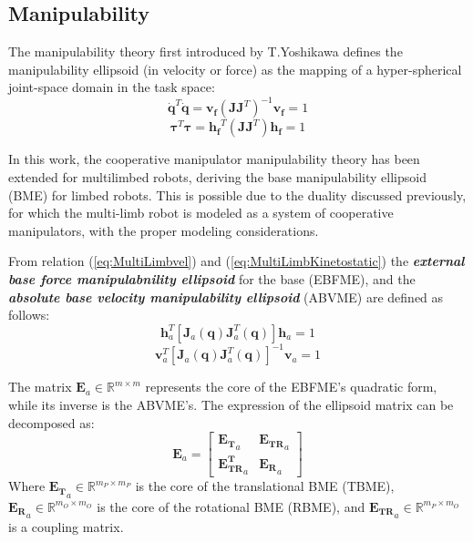 \documentclass[11pt,a4paper,twocolumn]{article}
\begin{document}
\subsection{Manipulability}
\label{subsec:manipulability}

The manipulability theory first introduced by T.Yoshikawa\cite{ManipulabilityYoshikawa} defines the manipulability ellipsoid (in velocity or force) as the mapping of a hyper-spherical joint-space domain in the task space: 
\begin{equation}
\label{eq:EllipsoidVel}
    \mathbf{\dot{q}}^T \mathbf{\dot{q}} = \mathbf{v_f}(\mathbf{J}\mathbf{J}^T)^{-1}\mathbf{v_f} = 1
\end{equation}
\begin{equation}
\label{eq:EllipsoidForce}
    \mathbf{\tau}^T \mathbf{\tau} = \mathbf{h_f}^T(\mathbf{J}\mathbf{J}^T)\mathbf{h_f} = 1
\end{equation}

In this work, the cooperative manipulator manipulability theory \cite{MultiArmManipulability} has been extended for multilimbed robots, deriving the base manipulability ellipsoid (BME) for limbed robots. This is possible due to the duality discussed previously, for which the multi-limb robot is modeled as a system of cooperative manipulators, with the proper modeling considerations. 

From relation (\ref{eq:MultiLimbvel}) and (\ref{eq:MultiLimbKinetostatic}) the \textit{\textbf{external base force manipulabnility ellipsoid}} for the base (EBFME), and the \textit{\textbf{absolute base velocity manipulability ellipsoid}} (ABVME) are defined as follows: 
\begin{equation}
    \mathbf{h}^T_a [\mathbf{J}_a(\mathbf{q})\mathbf{J}^T_a(\mathbf{q})]\mathbf{h}_a = 1
    \label{eq:BEFME}
\end{equation}
\begin{equation}
    \mathbf{v}^T_a [\mathbf{J}_a(\mathbf{q})\mathbf{J}^T_a(\mathbf{q})]^{-1}\mathbf{v}_a = 1
    \label{eq:ABVME}
\end{equation}

The matrix $\mathbf{E}_a \in \mathbb{R}^{m\times m}$ represents the core of the EBFME's quadratic form, while its inverse is the ABVME's. 
The expression of the ellipsoid matrix can be decomposed as: 
\begin{equation}
\label{eq:BME_decoupled}
    \mathbf{E}_a = \begin{bmatrix}
        \mathbf{E_T}_a & \mathbf{E_{TR}}_a \\
        \mathbf{E^T_{TR}}_a & \mathbf{E_{R}}_a 
    \end{bmatrix}
\end{equation}
Where $\mathbf{E_T}_a \in \mathbb{R}^{m_P \times m_P}$ is the core of the translational BME (TBME),  
$\mathbf{E_R}_a \in \mathbb{R}^{m_O \times m_O}$
is the core of the rotational BME (RBME),
and $\mathbf{E_{TR}}_a \in \mathbb{R}^{m_P \times m_O}$ is a coupling matrix\cite{TRManipulability}.
\end{document}
